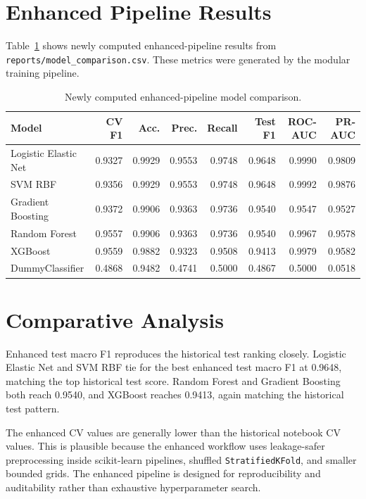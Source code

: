 \documentclass[11pt]{article}
\newcommand{\code}[1]{\texttt{#1}}
\begin{document}
\section{Enhanced Pipeline Results}

Table~\ref{tab:enhanced-results} shows newly computed enhanced-pipeline results from \code{reports/model\_comparison.csv}. These metrics were generated by the modular training pipeline.

\begin{table}[H]
\centering
\caption{Newly computed enhanced-pipeline model comparison.}
\label{tab:enhanced-results}
\small
\begin{tabular}{lrrrrrrr}
\toprule
Model & CV F1 & Acc. & Prec. & Recall & Test F1 & ROC-AUC & PR-AUC \\
\midrule
Logistic Elastic Net & 0.9327 & 0.9929 & 0.9553 & 0.9748 & 0.9648 & 0.9990 & 0.9809 \\
SVM RBF & 0.9356 & 0.9929 & 0.9553 & 0.9748 & 0.9648 & 0.9992 & 0.9876 \\
Gradient Boosting & 0.9372 & 0.9906 & 0.9363 & 0.9736 & 0.9540 & 0.9547 & 0.9527 \\
Random Forest & 0.9557 & 0.9906 & 0.9363 & 0.9736 & 0.9540 & 0.9967 & 0.9578 \\
XGBoost & 0.9559 & 0.9882 & 0.9323 & 0.9508 & 0.9413 & 0.9979 & 0.9582 \\
DummyClassifier & 0.4868 & 0.9482 & 0.4741 & 0.5000 & 0.4867 & 0.5000 & 0.0518 \\
\bottomrule
\end{tabular}
\end{table}

\section{Comparative Analysis}

Enhanced test macro F1 reproduces the historical test ranking closely. Logistic Elastic Net and SVM RBF tie for the best enhanced test macro F1 at 0.9648, matching the top historical test score. Random Forest and Gradient Boosting both reach 0.9540, and XGBoost reaches 0.9413, again matching the historical test pattern.

The enhanced CV values are generally lower than the historical notebook CV values. This is plausible because the enhanced workflow uses leakage-safer preprocessing inside scikit-learn pipelines, shuffled \code{StratifiedKFold}, and smaller bounded grids. The enhanced pipeline is designed for reproducibility and auditability rather than exhaustive hyperparameter search.
\end{document}
